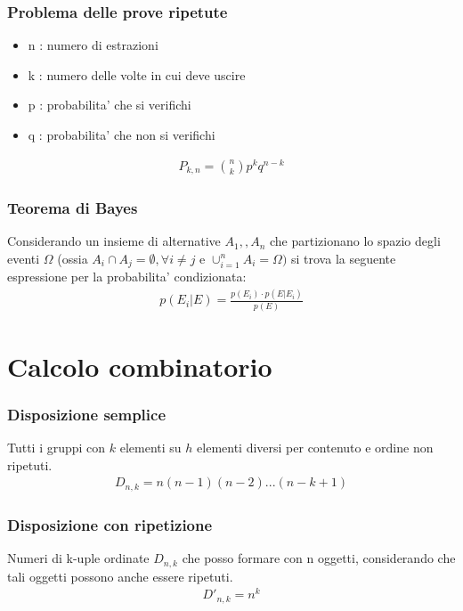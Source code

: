 \documentclass[a4paper]{article}
\begin{document}
	\subsubsection{Problema delle prove ripetute}
	\begin{itemize}
		\item n : numero di estrazioni
		\item k : numero delle volte in cui deve uscire
		\item p : probabilita' che si verifichi
		\item q : probabilita' che non si verifichi
	\end{itemize}

	\begin{align*}
		P_{k,n} = {{n}\choose{k}} p^kq^{n-k}
	\end{align*}
	
	\subsubsection{Teorema di Bayes}
	Considerando un insieme di alternative $A_{1}, ,A_{n}$ che partizionano lo spazio degli eventi $\Omega$ (ossia $A_{i} \cap A_{j} = \emptyset , \forall i\neq j$ e $\cup _{{i=1}}^{n}A_{i}=\Omega )$ si trova la seguente espressione per la probabilita' condizionata:
	\begin{align*}
		p(E_i|E)= \frac{p(E_i) \cdot p(E | E_i)}{p(E)}
	\end{align*}
	
	\newpage
	\section{Calcolo combinatorio}
	\subsubsection{Disposizione semplice}
	Tutti i gruppi con $k$ elementi su $h$ elementi diversi per contenuto e ordine non ripetuti.
	\begin{align*}
		D_{n,k} = n(n-1)(n-2)...(n-k+1)
	\end{align*}

	\subsubsection{Disposizione con ripetizione}
	Numeri di k-uple ordinate $D_{n,k}$ che posso formare con n oggetti, considerando che tali oggetti possono anche essere ripetuti.
	\begin{align*}
		D'_{n,k} = n^k
	\end{align*}
\end{document}
